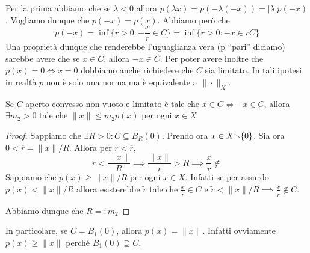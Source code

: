     Per la prima abbiamo che se \(\lambda < 0\) allora \(p {(\lambda x)} = p {( -\lambda {(-x)})} = |\lambda| p {(-x)}\). Vogliamo dunque che \(p {(-x)} = p {(x)}\). Abbiamo però che
    \[
      p {(-x )} = \inf \{r > 0 : -\frac{x}{r} \in C\} = \inf \{ r > 0 : -x \in rC\} 
    \]
    Una proprietà dunque che renderebbe l'uguaglianza vera (p ``pari'' diciamo)
    sarebbe avere che se \(x \in C\), allora \(-x \in C\). Per poter avere
    inoltre che \(p {(x)} = 0 \iff x = 0\) dobbiamo anche richiedere che \(C\)
    sia limitato. In tali ipotesi in realtà \(p\) non è solo una norma ma è
    equivalente a \(\|\cdot \|_X\).

\begin{proposition}{}
    Se \(C\) aperto convesso non vuoto e limitato è tale che \(x \in C \iff -x \in C\), allora \(\exists m_{2} > 0\) tale che \(\|x\| \le m_{2} p {(x)}\) per ogni \(x \in X\)
\end{proposition}
\begin{proof}{}
    Sappiamo che \(\exists R > 0 : C \subseteq B_{R} {(0)} \). Prendo ora \(x
    \in X \sminus \{0\} \). Sia ora \(0 < \overline{r} = \|x\| / R\). Allora per
    \(r < \overline{r}\), 
    \[
      r < \frac{\|x\|}{R} \implies \frac{\|x\|}{r} > R \implies \frac{x}{r}
      \not\in 
    \]
    Sappiamo che \(p {(x)} \ge  \|x\| / R\) per ogni \(x \in X\). Infatti se per
    assurdo \( p {( x)} < \|x\| /R\) allora esisterebbe \(\tilde{r}\) tale che
    \(\frac{x}{\tilde{r}} \in C\) e \(\tilde{r} < \|x\| / R \implies \frac{x}{\tilde{r}} \not\in C\).

    Abbiamo dunque che \(R =: m_{2}\) 
\end{proof}

In particolare, se \(C = B_{1}{(0)}\), allora \(p {(x)} = \|x\|\). Infatti
ovviamente \(p {(x)} \ge \|x\|\) perché \(B_{1}{(0)} \supseteq C\).

